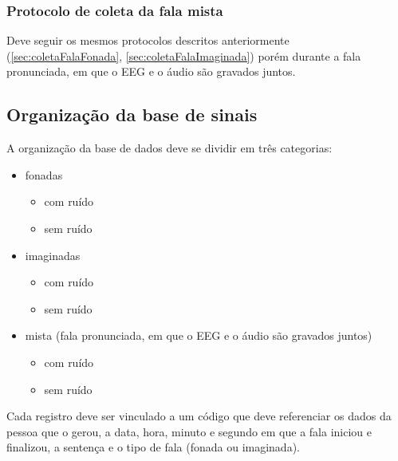 			\subsubsection{Protocolo de coleta da fala mista}
				\par Deve seguir os mesmos protocolos descritos anteriormente (\autoref{sec:coletaFalaFonada}, \autoref{sec:coletaFalaImaginada}) porém durante a fala pronunciada, em que o EEG e o áudio são gravados juntos.
				

	    \subsection{Organização da base de sinais}
	   		 \label{sec:baseDeSinaisOrganizacao}
	    	\par A organização da base de dados deve se dividir em três categorias:
	    	\begin{itemize}
	    		\item fonadas
	    		\begin{itemize}
	    			\item com ruído
	    			\item sem ruído
	    		\end{itemize}
	    		\item imaginadas
	    		\begin{itemize}
	    			\item com ruído
	    			\item sem ruído
	    		\end{itemize}
	    		\item mista (fala pronunciada, em que o EEG e o áudio são gravados juntos)
			    \begin{itemize}
	    			\item com ruído
	    			\item sem ruído
	    		\end{itemize}
	    	\end{itemize}

			\par Cada registro deve ser vinculado a um código que deve referenciar os dados da pessoa que o gerou, a data, hora, minuto e segundo em que a fala iniciou e finalizou, a sentença e o tipo de fala (fonada ou imaginada).
